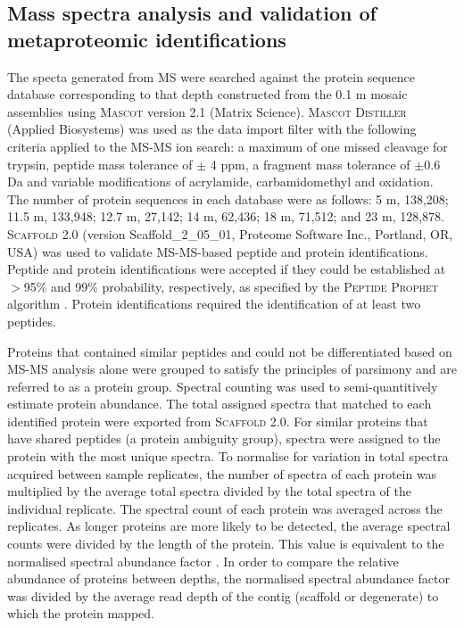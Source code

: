 \subsection{Mass spectra analysis and validation of metaproteomic identifications}
The specta generated from \ac{MS} were searched against the protein sequence database corresponding to that depth constructed from the 0.1 \textmu{}m mosaic assemblies using \textsc{Mascot} version 2.1 (Matrix Science).
\textsc{Mascot Distiller} (Applied Biosystems) was used as the data import filter with the following criteria applied to the \ac{MS-MS} ion search: a maximum of one missed cleavage for trypsin, peptide mass tolerance of $\pm$ 4 ppm, a fragment mass tolerance of $\pm$0.6 Da and variable modifications of acrylamide, carbamidomethyl and oxidation.
The number of protein sequences in each database were as follows: 5 m, 138,208; 11.5 m, 133,948; 12.7 m, 27,142; 14 m, 62,436; 18 m, 71,512; and 23 m, 128,878. 
\textsc{Scaffold} 2.0 (version Scaffold\_2\_05\_01, Proteome Software Inc., Portland, \textsc{OR}, \textsc{USA}) was used to validate \ac{MS-MS}-based peptide and protein identifications. 
Peptide and protein identifications were accepted if they could be established at $>$95\% and 99\% probability, respectively, as specified by the \textsc{Peptide Prophet} algorithm \cite{Keller2002}. 
Protein identifications required the identification of at least two peptides.
 
Proteins that contained similar peptides and could not be differentiated based on \ac{MS-MS} analysis alone were grouped to satisfy the principles of parsimony and are referred to as a protein group. 
Spectral counting was used to semi-quantitively estimate protein abundance. 
The total assigned spectra that matched to each identified protein were exported from \textsc{Scaffold} 2.0. 
For similar proteins that have shared peptides (a protein ambiguity group), spectra were assigned to the protein with the most unique spectra. 
To normalise for variation in total spectra acquired between sample replicates, the number of spectra of each protein was multiplied by the average total spectra divided by the total spectra of the individual replicate. 
The spectral count of each protein was averaged across the replicates. 
As longer proteins are more likely to be detected, the average spectral counts were divided by the length of the protein. 
This value is equivalent to the normalised spectral abundance factor \cite{Florens2006, Zybailov2006}. 
In order to compare the relative abundance of proteins between depths, the normalised spectral abundance factor was divided by the average read depth of the contig (scaffold or degenerate) to which the protein mapped. 

